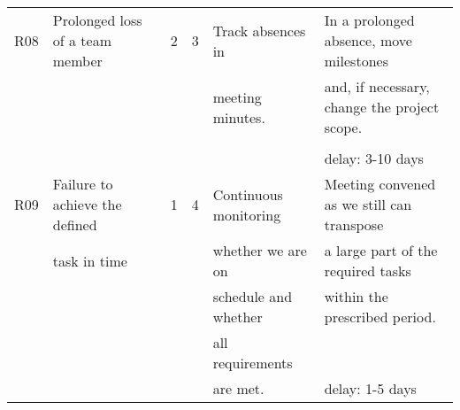 \begin{center}
\begin{longtable}{|p{0.5cm}|p{5.1cm}|p{0.17cm}|p{0.17cm}|p{2.97cm}|p{5.7cm}|}
	R08 & Prolonged loss of a team member  	& \cellcolor{yellow!50}2  	& \cellcolor{yellow!50}3 	& Track absences in	& In a prolonged absence, move milestones	\\
		&									& \cellcolor{yellow!50}  	& \cellcolor{yellow!50} 	& meeting minutes. 	& and, if necessary, change the project scope. \\
		&									& \cellcolor{yellow!50}  	& \cellcolor{yellow!50} 	& 					&												\\
		&									& \cellcolor{yellow!50}  	& \cellcolor{yellow!50} 	& 					& delay: 3-10 days 								\\ \hline	
		
	R09 & Failure to achieve the defined	& \cellcolor{yellow!50}1 	& \cellcolor{yellow!50}4 	& Continuous monitoring & Meeting convened as we still can transpose \\
		& task in time 						& \cellcolor{yellow!50} 	& \cellcolor{yellow!50} 	&  whether we are on 	& a large part of the required tasks 		\\
		& 			 						& \cellcolor{yellow!50} 	& \cellcolor{yellow!50} 	&  schedule and whether & within the prescribed period.				\\
		& 			 						& \cellcolor{yellow!50} 	& \cellcolor{yellow!50} 	&  all requirements 	&											\\
		& 			 						& \cellcolor{yellow!50} 	& \cellcolor{yellow!50} 	&  are met. 			& delay: 1-5 days 							\\ \hline
		
   \end{longtable}
\end{center}

